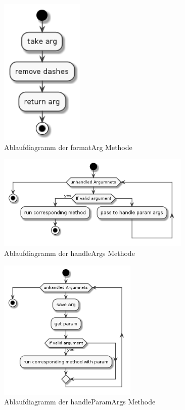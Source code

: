 \documentclass[stu, a4paper, 11pt, floatsintext]{apa7}
\begin{document}
\begin{figure}[!htbp]
\centering
\includegraphics[width=150px]{../technical_documentation/diagramm/uml/flowcharts/cli/formatArg.png}
\caption{\label{formatArg-methode}Ablaufdiagramm der formatArg Methode}
\end{figure}

\begin{figure}[!htbp]
\centering
\includegraphics[width=350px]{../technical_documentation/diagramm/uml/flowcharts/cli/handleArgs.png}
\caption{\label{handleArgs-methode}Ablaufdiagramm der handleArgs Methode}
\end{figure}

\begin{figure}[!htbp]
\centering
\includegraphics[width=250px]{../technical_documentation/diagramm/uml/flowcharts/cli/handleParamArgs.png}
\caption{\label{handleParamArgs-methode}Ablaufdiagramm der handleParamArgs Methode}
\end{figure}
\end{document}
